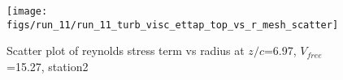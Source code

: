 \begin{figure}[H]
\centering
\texttt{[image: figs/run\_11/run\_11\_turb\_visc\_ettap\_top\_vs\_r\_mesh\_scatter]}
\caption{Scatter plot of reynolds stress term vs radius at $z/c$=6.97, $V_{free}$=15.27, station2}
\label{fig:run_11_turb_visc_ettap_top_vs_r_mesh_scatter}
\end{figure}


